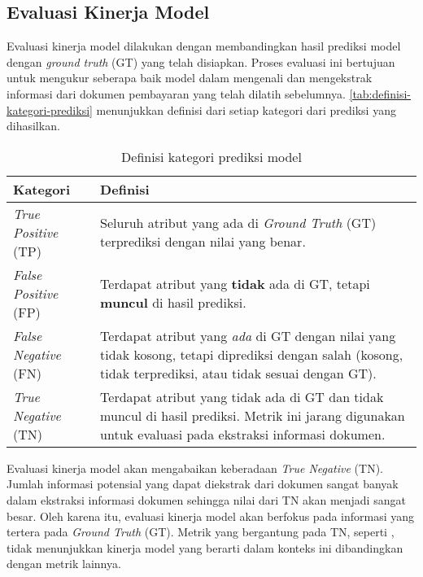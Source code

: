 \subsection{Evaluasi Kinerja Model}
\label{subsec:evaluasi-kinerja-model}

Evaluasi kinerja model dilakukan dengan membandingkan hasil prediksi model dengan \emph{ground truth} (GT) yang telah disiapkan. Proses evaluasi ini bertujuan untuk mengukur seberapa baik model dalam mengenali dan mengekstrak informasi dari dokumen pembayaran yang telah dilatih sebelumnya. \autoref{tab:definisi-kategori-prediksi} menunjukkan definisi dari setiap kategori dari prediksi yang dihasilkan.

\begin{table}[h!]
    \centering
    \caption{Definisi kategori prediksi model}
    \label{tab:definisi-kategori-prediksi}
    \begin{tabularx}{\textwidth}{|p{2.5cm}|X|}
        \hline
        \textbf{Kategori} & \textbf{Definisi} \\ \hline
        \emph{True Positive} (TP) & Seluruh atribut yang ada di \emph{Ground Truth} (GT) terprediksi dengan nilai yang benar. \\ \hline
        \emph{False Positive} (FP) & Terdapat atribut yang \textbf{tidak} ada di GT, tetapi \textbf{muncul} di hasil prediksi. \\ \hline
        \emph{False Negative} (FN) & Terdapat atribut yang \emph{ada} di GT dengan nilai yang tidak kosong, tetapi diprediksi dengan salah (kosong, tidak terprediksi, atau tidak sesuai dengan GT). \\ \hline
        \emph{True Negative} (TN) & Terdapat atribut yang tidak ada di GT dan tidak muncul di hasil prediksi. Metrik ini jarang digunakan untuk evaluasi pada ekstraksi informasi dokumen. \\ \hline
    \end{tabularx}
\end{table}

Evaluasi kinerja model akan mengabaikan keberadaan \emph{True Negative} (TN). Jumlah informasi potensial yang dapat diekstrak dari dokumen sangat banyak dalam ekstraksi informasi dokumen sehingga nilai dari TN akan menjadi sangat besar. Oleh karena itu, evaluasi kinerja model akan berfokus pada informasi yang tertera pada \emph{Ground Truth} (GT). Metrik yang bergantung pada TN, seperti \accuracy, tidak menunjukkan kinerja model yang berarti dalam konteks ini dibandingkan dengan metrik lainnya. 

